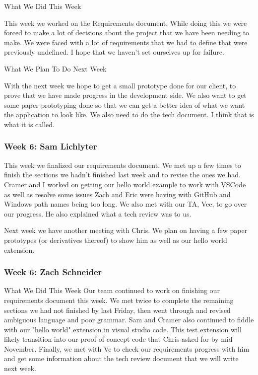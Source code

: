 What We Did This Week

This week we worked on the Requirements document. While doing this we were forced to make a lot of decisions about the project that we have been needing to make. We were faced with a lot of requirements that we had to define that were previously undefined. I hope that we haven't set ourselves up for failure. 

What We Plan To Do Next Week

With the next week we hope to get a small prototype done for our client, to prove that we have made progress in the development side. We also want to get some paper prototyping done so that we can get a better idea of what we want the application to look like. We also need to do the tech document. I think that is what it is called.


\subsubsection{Week 6: Sam Lichlyter}

This week we finalized our requirements document. We met up a few times to finish the sections we hadn't finished last week and to revise the ones we had. Cramer and I worked on getting our hello world example to work with VSCode as well as resolve some issues Zach and Eric were having with GitHub and Windows path names being too long. We also met with our TA, Vee, to go over our progress. He also explained what a tech review was to us.

Next week we have another meeting with Chris. We plan on having a few paper prototypes (or derivatives thereof) to show him as well as our hello world extension.

\subsubsection{Week 6: Zach Schneider}

What We Did This Week
Our team continued to work on finishing our requirements document this week. We met twice to complete the remaining sections we had not finished by last Friday, then went through and revised ambiguous language and poor grammar. Sam and Cramer also continued to fiddle with our "hello world" extension in visual studio code. This test extension will likely transition into our proof of concept code that Chris asked for by mid November. Finally, we met with Ve to check our requirements progress with him and get some information about the tech review document that we will write next week.

